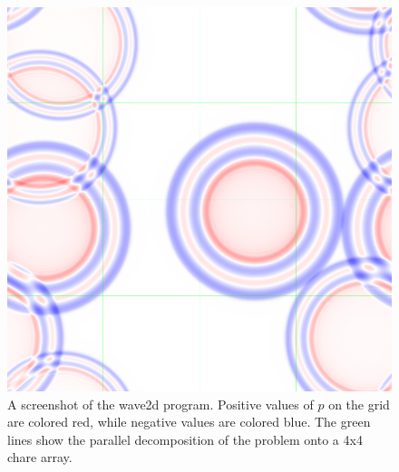 \documentclass{article}
\begin{document}
\begin{figure}
\begin{center}
\includegraphics[width=5in]{screenshot}
\caption{A screenshot of the wave2d program. Positive values of $p$ on the grid are colored red, while negative values are colored blue. The green lines show the parallel decomposition of the problem onto a 4x4 chare array.
\label{screenshot}}
\end{center}
\end{figure} 
\end{document}

